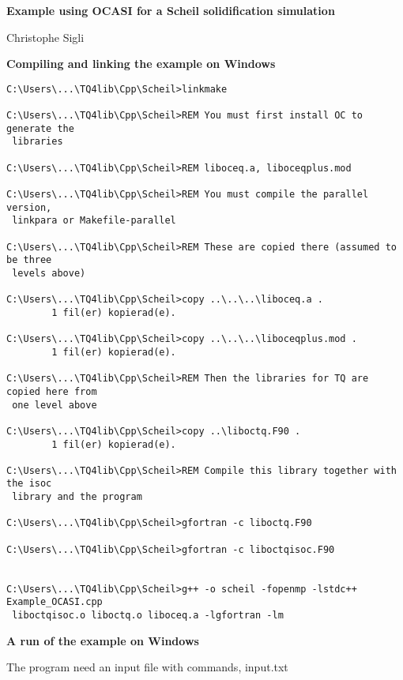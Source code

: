 \documentclass[12pt]{article}
\begin{document}
\begin{center}
{\large \bf Example using OCASI for a Scheil solidification simulation}

\bigskip

Christophe Sigli

\end{center}

\bigskip

{\Large \bf Compiling and linking the example on Windows}

\bigskip

{\small
\begin{verbatim}
C:\Users\...\TQ4lib\Cpp\Scheil>linkmake

C:\Users\...\TQ4lib\Cpp\Scheil>REM You must first install OC to generate the
 libraries

C:\Users\...\TQ4lib\Cpp\Scheil>REM liboceq.a, liboceqplus.mod

C:\Users\...\TQ4lib\Cpp\Scheil>REM You must compile the parallel version,
 linkpara or Makefile-parallel

C:\Users\...\TQ4lib\Cpp\Scheil>REM These are copied there (assumed to be three
 levels above)

C:\Users\...\TQ4lib\Cpp\Scheil>copy ..\..\..\liboceq.a .
        1 fil(er) kopierad(e).

C:\Users\...\TQ4lib\Cpp\Scheil>copy ..\..\..\liboceqplus.mod .
        1 fil(er) kopierad(e).

C:\Users\...\TQ4lib\Cpp\Scheil>REM Then the libraries for TQ are copied here from
 one level above

C:\Users\...\TQ4lib\Cpp\Scheil>copy ..\liboctq.F90 .
        1 fil(er) kopierad(e).

C:\Users\...\TQ4lib\Cpp\Scheil>REM Compile this library together with the isoc
 library and the program

C:\Users\...\TQ4lib\Cpp\Scheil>gfortran -c liboctq.F90

C:\Users\...\TQ4lib\Cpp\Scheil>gfortran -c liboctqisoc.F90


C:\Users\...\TQ4lib\Cpp\Scheil>g++ -o scheil -fopenmp -lstdc++ Example_OCASI.cpp
 liboctqisoc.o liboctq.o liboceq.a -lgfortran -lm

\end{verbatim}}

\newpage

{\large \bf A run of the example on Windows}

\bigskip

The program need an input file with commands, input.txt
\end{document}
